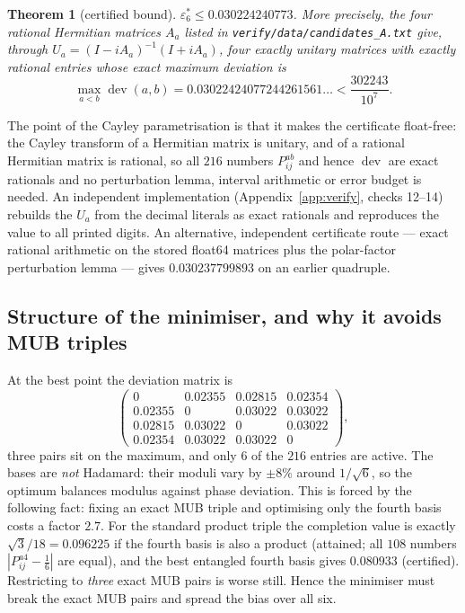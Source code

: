 \documentclass[11pt,a4paper]{article}
\newtheorem{theorem}{Theorem}[section]
\theoremstyle{remark}
\newcommand{\dev}{\operatorname{dev}}
\newcommand{\eps}{\varepsilon}
\begin{document}
\begin{theorem}[certified bound]\label{thm:cert}
$\eps_6^*\le 0.030224240773$.  More precisely, the four rational Hermitian matrices $A_a$
listed in \texttt{verify/data/candidates\_A.txt} give, through
$U_a=(I-iA_a)^{-1}(I+iA_a)$, four exactly unitary matrices with exactly rational entries
whose exact maximum deviation is
\[
\max_{a<b}\dev(a,b)=0.03022424077244261561\ldots<\frac{302243}{10^{7}} .
\]
\end{theorem}
The point of the Cayley parametrisation is that it makes the certificate float-free: the
Cayley transform of a Hermitian matrix is unitary, and of a rational Hermitian matrix is
rational, so all $216$ numbers $P^{ab}_{ij}$ and hence $\dev$ are exact rationals and no
perturbation lemma, interval arithmetic or error budget is needed.  An independent
implementation (Appendix~\ref{app:verify}, checks 12--14) rebuilds the $U_a$ from the decimal
literals as exact rationals and reproduces the value to all printed digits.  An alternative,
independent certificate route --- exact rational arithmetic on the stored float64 matrices
plus the polar-factor perturbation lemma --- gives $0.030237799893$ on an earlier quadruple.

\subsection{Structure of the minimiser, and why it avoids MUB triples}
At the best point the deviation matrix is
\[
\begin{pmatrix}
0&0.02355&0.02815&0.02354\\
0.02355&0&0.03022&0.03022\\
0.02815&0.03022&0&0.03022\\
0.02354&0.03022&0.03022&0
\end{pmatrix},
\]
three pairs sit on the maximum, and only $6$ of the $216$ entries are active.  The bases are
\emph{not} Hadamard: their moduli vary by $\pm8\%$ around $1/\sqrt6$, so the optimum balances
modulus against phase deviation.  This is forced by the following fact: fixing an exact MUB
triple and optimising only the fourth basis costs a factor $2.7$.  For the standard product
triple the completion value is exactly $\sqrt3/18=0.096225$ if the fourth basis is also a
product (attained; all $108$ numbers $|P^{a4}_{ij}-\tfrac16|$ are equal), and the best
entangled fourth basis gives $0.080933$ (certified).  Restricting to \emph{three} exact MUB
pairs is worse still.  Hence the minimiser must break the exact MUB pairs and spread the bias
over all six.
\end{document}
